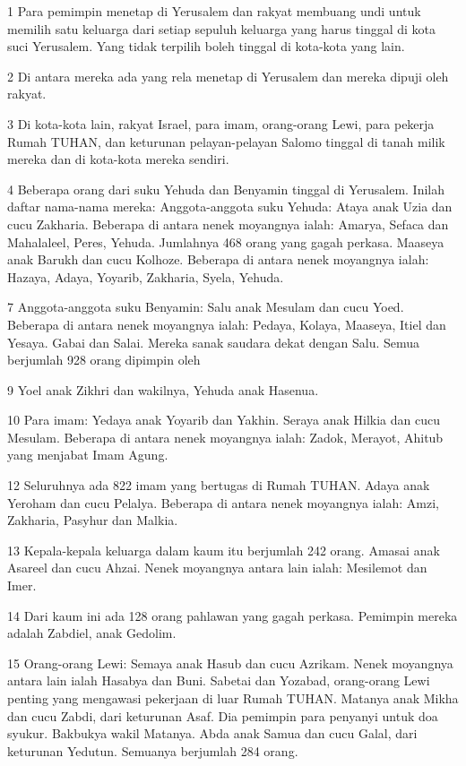 \par 1 Para pemimpin menetap di Yerusalem dan rakyat membuang undi untuk memilih satu keluarga dari setiap sepuluh keluarga yang harus tinggal di kota suci Yerusalem. Yang tidak terpilih boleh tinggal di kota-kota yang lain.
\par 2 Di antara mereka ada yang rela menetap di Yerusalem dan mereka dipuji oleh rakyat.
\par 3 Di kota-kota lain, rakyat Israel, para imam, orang-orang Lewi, para pekerja Rumah TUHAN, dan keturunan pelayan-pelayan Salomo tinggal di tanah milik mereka dan di kota-kota mereka sendiri.
\par 4 Beberapa orang dari suku Yehuda dan Benyamin tinggal di Yerusalem. Inilah daftar nama-nama mereka: Anggota-anggota suku Yehuda: Ataya anak Uzia dan cucu Zakharia. Beberapa di antara nenek moyangnya ialah: Amarya, Sefaca dan Mahalaleel, Peres, Yehuda. Jumlahnya 468 orang yang gagah perkasa. Maaseya anak Barukh dan cucu Kolhoze. Beberapa di antara nenek moyangnya ialah: Hazaya, Adaya, Yoyarib, Zakharia, Syela, Yehuda.
\par 7 Anggota-anggota suku Benyamin: Salu anak Mesulam dan cucu Yoed. Beberapa di antara nenek moyangnya ialah: Pedaya, Kolaya, Maaseya, Itiel dan Yesaya. Gabai dan Salai. Mereka sanak saudara dekat dengan Salu. Semua berjumlah 928 orang dipimpin oleh
\par 9 Yoel anak Zikhri dan wakilnya, Yehuda anak Hasenua.
\par 10 Para imam: Yedaya anak Yoyarib dan Yakhin. Seraya anak Hilkia dan cucu Mesulam. Beberapa di antara nenek moyangnya ialah: Zadok, Merayot, Ahitub yang menjabat Imam Agung.
\par 12 Seluruhnya ada 822 imam yang bertugas di Rumah TUHAN. Adaya anak Yeroham dan cucu Pelalya. Beberapa di antara nenek moyangnya ialah: Amzi, Zakharia, Pasyhur dan Malkia.
\par 13 Kepala-kepala keluarga dalam kaum itu berjumlah 242 orang. Amasai anak Asareel dan cucu Ahzai. Nenek moyangnya antara lain ialah: Mesilemot dan Imer.
\par 14 Dari kaum ini ada 128 orang pahlawan yang gagah perkasa. Pemimpin mereka adalah Zabdiel, anak Gedolim.
\par 15 Orang-orang Lewi: Semaya anak Hasub dan cucu Azrikam. Nenek moyangnya antara lain ialah Hasabya dan Buni. Sabetai dan Yozabad, orang-orang Lewi penting yang mengawasi pekerjaan di luar Rumah TUHAN. Matanya anak Mikha dan cucu Zabdi, dari keturunan Asaf. Dia pemimpin para penyanyi untuk doa syukur. Bakbukya wakil Matanya. Abda anak Samua dan cucu Galal, dari keturunan Yedutun. Semuanya berjumlah 284 orang.
